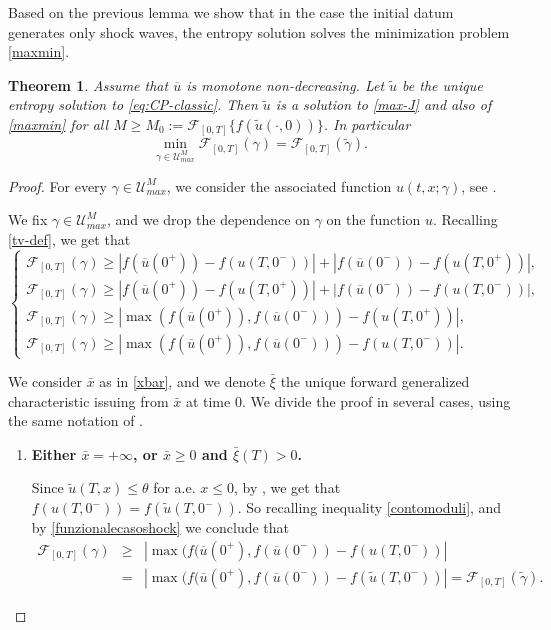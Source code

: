 \documentclass[a4paper, 10pt, final]{article}
\newtheorem{theorem}{Theorem}[section]
\begin{document}
  Based on the previous lemma we show that in the case the initial datum generates only shock waves, 
  the entropy solution solves the minimization problem \eqref{maxmin}. 
  \begin{theorem} 
    \label{mon} Assume that 
  $\overline u $ is  monotone non-decreasing. 
  Let $\widetilde u$ be the unique entropy solution to \eqref{eq:CP-classic}.
  Then $\widetilde u$ is a  solution to \eqref{max-J} and also of \eqref{maxmin} for all 
  $M\geq M_0:=\mathcal F_{[0,T]} \{f(\widetilde u(\cdot, 0))\}$. In particular
    \begin{equation*}\min_{\gamma\in \mathcal{U}^M_{max}}\mathcal{F}_{[0,T]}(\gamma)
    =\mathcal{F}_{[0,T]}(\widetilde \gamma ).
    \end{equation*}
  \end{theorem}
  \begin{proof}
    For every $\gamma\in \mathcal{U}^M_{max}$, we consider the associated function $u(t,x;\gamma)$, 
    see .  
    
    We fix $\gamma\in \mathcal{U}^M_{max}$, and we drop the dependence on $\gamma$ on the function $u$.
    Recalling \eqref{tv-def}, we get that 
  \begin{equation}\label{contomoduli} \begin{cases}\mathcal{F}_{[0,T]}(\gamma)\geq |f(\overline u(0^+)) - f( u(T,0^-))| 
    + |f(\overline u(0^-))-f(u(T,0^+))|,
\\   \mathcal{F}_{[0,T]}(\gamma)\geq  |f(\overline u(0^+)) - f( u(T,0^+))| + |f(\overline u(0^-))-f(u(T,0^-))|,\\   
\mathcal{F}_{[0,T]}(\gamma) \geq|\max(f(\overline u(0^+)),f(\overline u(0^-)))  - f( u(T,0^+))|,  \\ 
\mathcal{F}_{[0,T]}(\gamma)\geq |\max(f(\overline u(0^+)),f(\overline u(0^-)))  - f( u(T,0^-))|  . 
  \end{cases}\end{equation}
 


  We consider $\bar x$ as in \eqref{xbar}, and we denote $\bar \xi$ the unique 
  forward generalized characteristic issuing from  $\bar x$ at time $0$. 
  We divide the proof in several cases, using the same notation of .  
  \begin{enumerate} 
 \item  {\bf Either $\bar x=+\infty$, or $\bar x\geq  0$ and $\bar \xi(T)>0$.}
 
Since $\widetilde u(T, x)\leq \theta $ for a.e.  $x\leq  0$, by , we get that $f( u(T,0^-))=f( \widetilde u(T,0^-))$. So  recalling inequality  \eqref{contomoduli}, and by \eqref{funzionalecasoshock} we conclude that
\begin{eqnarray*}\mathcal{F}_{[0,T]}(\gamma)&\geq& |\max(f(\overline u(0^+), f(\overline u(0^-)) - f( u(T,0^-))| \\ &=&|\max(f(\overline u(0^+), f(\overline u(0^-)) - f( \widetilde u(T,0^-))|= \mathcal{F}_{[0,T]}(\widetilde \gamma) .\end{eqnarray*}


\end{enumerate}
\end{proof}
\end{document}
